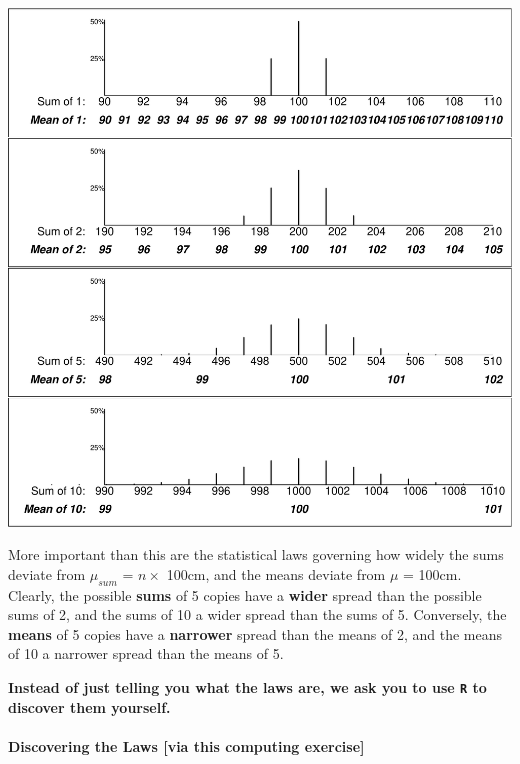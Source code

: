 \documentclass[
]{article}
\begin{document}
\begin{center}\includegraphics{hanley-computing_files/figure-latex/unnamed-chunk-2-1} \end{center}

More important than this are the statistical laws governing how widely
the sums deviate from \(\mu_{sum}\) = \(n \times\) 100cm, and the means
deviate from \(\mu\) = 100cm. Clearly, the possible \textbf{sums} of 5
copies have a \textbf{wider} spread than the possible sums of 2, and the
sums of 10 a wider spread than the sums of 5. Conversely, the
\textbf{means} of 5 copies have a \textbf{narrower} spread than the
means of 2, and the means of 10 a narrower spread than the means of 5.

\textbf{Instead of just telling you what the laws are, we ask you to use
\texttt{R} to discover them yourself.}

\hypertarget{discovering-the-laws-via-this-computing-exercise}{%
\paragraph{Discovering the Laws {[}via this computing
exercise{]}}\label{discovering-the-laws-via-this-computing-exercise}}
\end{document}

